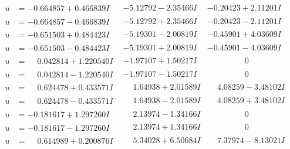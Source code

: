 \documentclass[1p]{elsarticle_modified}
\theoremstyle{definition}
\begin{document}
$$\begin{array}{c|c|c}
\begin{aligned}
u &= -0.664857 + 0.466839 I\end{aligned}
 & -5.12792 - 2.35466 I & -0.20423 + 2.11201 I \\ \hline\begin{aligned}
u &= -0.664857 - 0.466839 I\end{aligned}
 & -5.12792 + 2.35466 I & -0.20423 - 2.11201 I \\ \hline\begin{aligned}
u &= -0.651503 + 0.484423 I\end{aligned}
 & -5.19301 - 2.00819 I & -0.45901 + 4.03609 I \\ \hline\begin{aligned}
u &= -0.651503 - 0.484423 I\end{aligned}
 & -5.19301 + 2.00819 I & -0.45901 - 4.03609 I \\ \hline\begin{aligned}
u &= \phantom{-}0.042814 + 1.220540 I\end{aligned}
 & -1.97107 + 1.50217 I & \phantom{-0.000000 } 0 \\ \hline\begin{aligned}
u &= \phantom{-}0.042814 - 1.220540 I\end{aligned}
 & -1.97107 - 1.50217 I & \phantom{-0.000000 } 0 \\ \hline\begin{aligned}
u &= \phantom{-}0.624478 + 0.433571 I\end{aligned}
 & \phantom{-}1.64938 + 2.01589 I & \phantom{-}4.08259 - 3.48102 I \\ \hline\begin{aligned}
u &= \phantom{-}0.624478 - 0.433571 I\end{aligned}
 & \phantom{-}1.64938 - 2.01589 I & \phantom{-}4.08259 + 3.48102 I \\ \hline\begin{aligned}
u &= -0.181617 + 1.297260 I\end{aligned}
 & \phantom{-}2.13974 - 1.34166 I & \phantom{-0.000000 } 0 \\ \hline\begin{aligned}
u &= -0.181617 - 1.297260 I\end{aligned}
 & \phantom{-}2.13974 + 1.34166 I & \phantom{-0.000000 } 0 \\ \hline\begin{aligned}
u &= \phantom{-}0.614989 + 0.200876 I\end{aligned}
 & \phantom{-}5.34028 + 6.50684 I & \phantom{-}7.37974 - 8.13021 I \\ \hline\begin{aligned}

\end{aligned}
\end{array}$$
\end{document}

